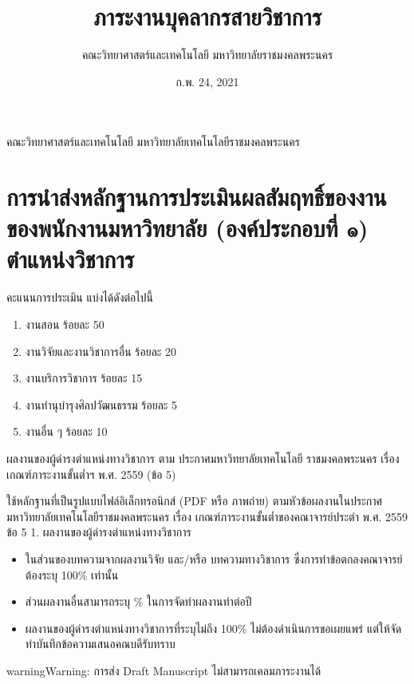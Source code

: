 \documentclass[a4paper,12pt,english]{sphinxmanual}
\title{ภาระงานบุคลากรสายวิชาการ}
\date{ก.พ. 24, 2021}
\author{คณะวิทยาศาสตร์และเทคโนโลยี มหาวิทยาลัยราชมงคลพระนคร}
\begin{document}
\pagestyle{empty}
\sphinxmaketitle
\pagestyle{plain}
\sphinxtableofcontents
\pagestyle{normal}
\label{\detokenize{index::doc}}


คณะวิทยาศาสตร์และเทคโนโลยี มหาวิทยาลัยเทคโนโลยีราชมงคลพระนคร


\chapter{การนำส่งหลักฐานการประเมินผลสัมฤทธิ์ของงานของพนักงานมหาวิทยาลัย (องค์ประกอบที่ ๑)  ตำแหน่งวิชาการ}
\label{\detokenize{submission_part1:id1}}\label{\detokenize{submission_part1::doc}}
คะแนนการประเมิน แบ่งได้ดังต่อไปนี้
\begin{enumerate}
%
\item {} 
งานสอน ร้อยละ 50

\item {} 
งานวิจัยและงานวิชาการอื่น ร้อยละ 20

\item {} 
งานบริการวิชาการ ร้อยละ 15

\item {} 
งานทำนุบำรุงศิลปวัฒนธรรม ร้อยละ 5

\item {} 
งานอื่น ๆ ร้อยละ 10

\end{enumerate}

ผลงานของผู้ดำรงตำแหน่งทางวิชาการ ตาม ประกาศมหาวิทยาลัยเทคโนโลยี
ราชมงคลพระนคร เรื่อง เกณฑ์ภาระงานขั้นต่ำฯ พ.ศ. 2559 (ข้อ 5)

ใช้หลักฐานที่เป็นรูปแบบไฟล์อิเล็กทรอนิกส์ (PDF หรือ ภาพถ่าย) ตามหัวข้อผลงานในประกาศมหาวิทยาลัยเทคโนโลยีราชมงคลพระนคร เรื่อง เกณฑ์ภาระงานขั้นต่ำของคณาจารย์ประตำ พ.ศ. 2559 ข้อ 5 1. ผลงานของผู้ดำรงตำแหน่งทางวิชาการ
\begin{itemize}
\item {} 
ในส่วนของบทความจากผลงานวิจัย และ/หรือ บทความทางวิชาการ ซึ่งการทำข้อตกลงคณาจารย์ต้องระบุ 100\% เท่านั้น

\item {} 
ส่วนผลงานอื่นสามารถระบุ \% ในการจัดทำผลงานทำต่อปี

\item {} 
ผลงานของผู้ดำรงตำแหน่งทางวิชาการที่ระบุไม่ถึง 100\% ไม่ต้องดำเนินการขอเผยแพร่ แต่ให้จัดทำบันทึกข้อความเสนอคณบดีรับทราบ

\end{itemize}

\begin{sphinxadmonition}{warning}{Warning:}
การส่ง Draft Manuscript ไม่สามารถเคลมภาระงานได้
\end{sphinxadmonition}
\end{document}
